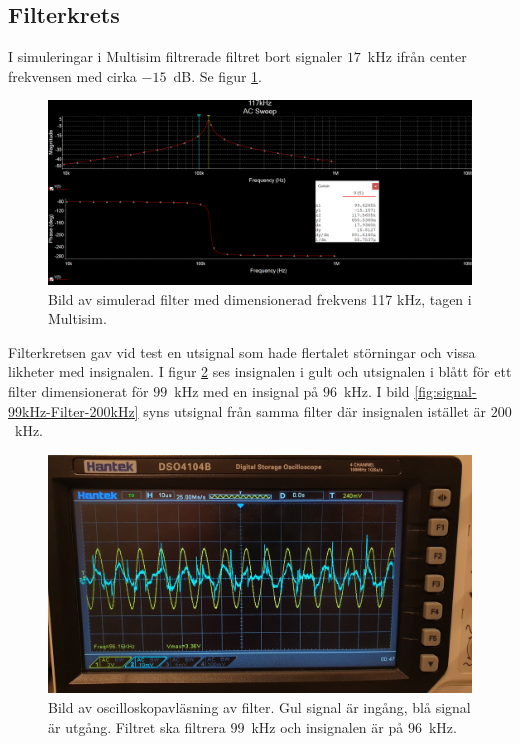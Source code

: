 \documentclass[a4paper]{article}
\begin{document}
\begin{sloppypar}
    \subsection{Filterkrets}
    I simuleringar i Multisim filtrerade filtret bort signaler $17$~kHz ifrån center frekvensen med cirka $-15$~dB. Se figur \ref{fig:sim-117kHz-filter}.
    \begin{figure}[H]
        \centering
        \includegraphics[width=\textwidth]{filter117kHz.png}
        \caption{Bild av simulerad filter med dimensionerad frekvens 117 kHz, tagen i Multisim.}
        \label{fig:sim-117kHz-filter}
    \end{figure}
    \noindent
    Filterkretsen gav vid test en utsignal som hade flertalet störningar och vissa likheter med insignalen. I figur \ref{fig:signal-99kHz-Filter-100kHz} 
    ses insignalen i gult och utsignalen i blått för ett filter dimensionerat för $99$~kHz med en insignal på $96$~kHz. I bild \ref{fig:signal-99kHz-Filter-200kHz} 
    syns utsignal från samma filter där insignalen istället är $200$~kHz.  
    \begin{figure}
        \centering
        \includegraphics[width=\textwidth]{Filter-100kHz.jpg}
        \caption{Bild av oscilloskopavläsning av filter. Gul signal är ingång, blå signal är utgång. Filtret ska filtrera $99$~kHz och insignalen är på $96$~kHz.}
        \label{fig:signal-99kHz-Filter-100kHz}
    \end{figure}


\end{sloppypar}
\end{document}
